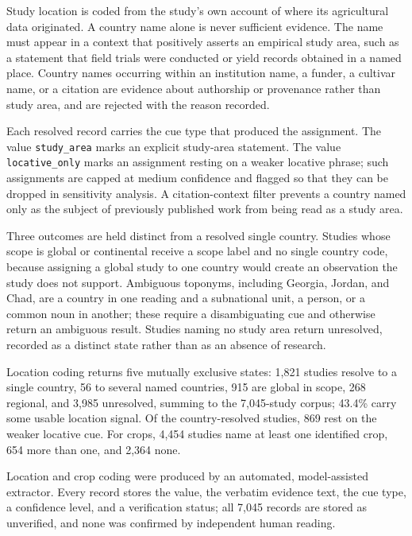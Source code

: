 \documentclass[ASNA,twocolumn]{USG}
\makeatletter
\newcommand{\applabel}[2]{\phantomsection\edef\@currentlabel{#1}\label{#2}}
\makeatother
\begin{document}
\applabel{Appendix B}{app:coding}

Study location is coded from the study's own account of where its agricultural data
originated. A country name alone is never sufficient evidence. The name must appear in a
context that positively asserts an empirical study area, such as a statement that field
trials were conducted or yield records obtained in a named place. Country names occurring
within an institution name, a funder, a cultivar name, or a citation are evidence about
authorship or provenance rather than study area, and are rejected with the reason recorded.

Each resolved record carries the cue type that produced the assignment. The value
\texttt{study\_area} marks an explicit study-area statement. The value
\texttt{locative\_only} marks an assignment resting on a weaker locative phrase; such
assignments are capped at medium confidence and flagged so that they can be dropped in
sensitivity analysis. A citation-context filter prevents a country named only as the subject
of previously published work from being read as a study area.

Three outcomes are held distinct from a resolved single country. Studies whose scope is
global or continental receive a scope label and no single country code, because assigning a
global study to one country would create an observation the study does not support. Ambiguous
toponyms, including Georgia, Jordan, and Chad, are a country in one reading and a subnational
unit, a person, or a common noun in another; these require a disambiguating cue and otherwise
return an ambiguous result. Studies naming no study area return unresolved, recorded as a
distinct state rather than as an absence of research.

Location coding returns five mutually exclusive states: 1,821 studies resolve to a single
country, 56 to several named countries, 915 are global in scope, 268 regional, and 3,985
unresolved, summing to the 7,045-study corpus; 43.4\% carry some usable location
signal. Of the country-resolved studies, 869 rest on the weaker locative cue. For crops,
4,454 studies name at least one identified crop, 654 more than one, and 2,364 none.

Location and crop coding were produced by an automated, model-assisted extractor. Every record
stores the value, the verbatim evidence text, the cue type, a confidence level, and a
verification status; all 7,045 records are stored as unverified, and none was confirmed by
independent human reading.
\end{document}
